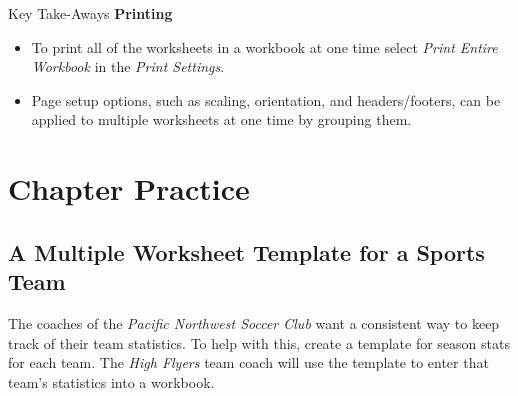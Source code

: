 \begin{center}
	\begin{tkwbox}{Key Take-Aways}
		\textbf{Printing}
		\\
		\begin{itemize}
			\setlength{\itemsep}{0pt}
			\setlength{\parskip}{0pt}
			\setlength{\parsep}{0pt}
			
			\item To print all of the worksheets in a workbook at one time select \textit{Print Entire Workbook} in the \textit{Print Settings}.
			\item Page setup options, such as scaling, orientation, and headers/footers, can be applied to multiple worksheets at one time by grouping them.
			
		\end{itemize}
	\end{tkwbox}
\end{center}

\section{Chapter Practice}

\subsection{A Multiple Worksheet Template for a Sports Team}

The coaches of the \textit{Pacific Northwest Soccer Club} want a consistent way to keep track of their team statistics. To help with this, create a template for season stats for each team. The \textit{High Flyers} team coach will use the template to enter that team's statistics into a workbook.


